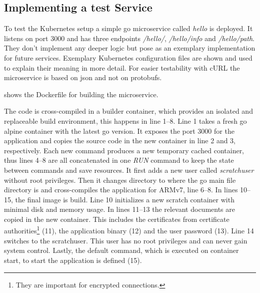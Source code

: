 \subsection{Implementing a test Service} \label{sec:testService}
To test the Kubernetes setup a simple go microservice called \textit{hello} is deployed. It listens on port 3000 and has three endpoints \textit{/hello/}, \textit{/hello/info} and \textit{/hello/path}. They don't implement any deeper logic but pose as an exemplary implementation for future services. Exemplary Kubernetes configuration files are shown and used to explain their meaning in more detail. For easier testability with cURL the microservice is based on json and not on protobufs.

 shows the Dockerfile for building the microservice.
\clearpage

The code is cross-compiled in a builder container, which provides an isolated and replaceable build environment, this happens in line 1--8. Line 1 takes a fresh go alpine container with the latest go version. It exposes the port 3000 for the application and copies the source code in the new container in line 2 and 3, respectively. Each new command produces a new temporary cached container, thus lines 4--8 are all concatenated in one \textit{RUN} command to keep the state between commands and save resources. It first adds a new user called \textit{scratchuser} without root privileges. Then it changes directory to where the go main file directory is and cross-compiles the application for ARMv7, line 6--8. In lines 10--15, the final image is build. Line 10 initializes a new scratch container with minimal disk and memory usage. In lines 11--13 the relevant documents are copied in the new container. This includes the certificates from certificate authorities\footnote{They are important for encrypted connections.} (11), the application binary (12) and the user password (13). Line 14 switches to the scratchuser. This user has no root privileges and can never gain system control. Lastly, the default command, which is executed on container start, to start the application is defined (15).

